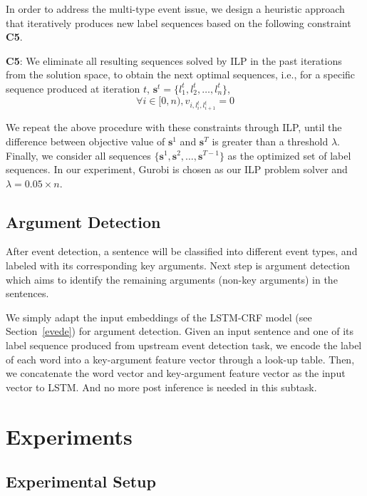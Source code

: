 \documentclass{article}
\begin{document}
In order to address the multi-type event issue, we design a heuristic approach that iteratively produces new label sequences based on the following constraint \textbf{C5}.

\textbf{C5}: We eliminate all resulting sequences solved by ILP in the past iterations from the solution space, to obtain the next optimal sequences, i.e., for a specific sequence produced at iteration $t$, $\bm{s}^t=\{l_1^t, l_2^t, \ldots, l_n^t\}$,  
\begin{equation}
	\forall i \in {[0, n)}, v_{i,l_i^t ,l_{i+1}^t} = 0	
\end{equation}

We repeat the above procedure with these constraints through ILP, until the difference between objective value of $\bm{s}^1$ and $\bm{s}^T$ is greater than a threshold $\lambda$. Finally, we consider all sequences $\{\bm{s}^1, \bm{s}^2, \ldots, \bm{s}^{T-1}\}$ as the optimized set of label sequences. In our experiment, Gurobi \cite{gurobi} is chosen as our ILP problem solver and $\lambda=0.05 \times n$.

\subsection{Argument Detection}
After event detection, a sentence will be classified into different event types, and labeled with its corresponding key arguments. Next step is argument detection which aims to identify the remaining arguments (non-key arguments) in the sentences.  

We simply adapt the input embeddings of the LSTM-CRF model (see Section~\ref{evede}) for argument detection. Given an input sentence and one of its label sequence produced from upstream event detection task, we encode the label of each word into a key-argument feature vector through a look-up table. Then, we concatenate the word vector and key-argument feature vector as the input vector to LSTM. And no more post inference is needed in this subtask.

\section{Experiments}

\subsection{Experimental Setup}
\end{document}
